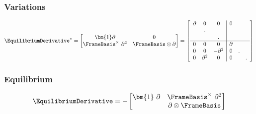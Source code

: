 \subsubsection{Variations}

$$
\EquilibriumDerivative^* 
=\begin{bmatrix}
\bm{1}\partial & 0 \\
\FrameBasis^{\times}~\partial^2 & \FrameBasis \otimes\partial
\end{bmatrix}
= \left[\begin{array}{ccc|ccc}
\partial & 0 & 0 & 0 \\
& . & \\
& & . \\ \hline
0 & 0 & 0 & \partial & & \\
0 & 0 & -\partial^2 & 0 & . \\
0 & \partial^2 & 0 & 0 & & . \\
\end{array}\right]
$$

\subsubsection{Equilibrium}

\begin{equation}
\EquilibriumDerivative = -\begin{bmatrix}
\bm{1}~\partial  & \FrameBasis^{\times} ~\partial^2 \\
 & \partial \otimes \FrameBasis 
\end{bmatrix}
\end{equation}

